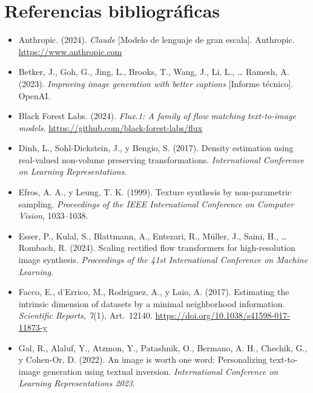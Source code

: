 \documentclass[12pt, a4paper, twoside]{book}
\begin{document}
\chapter*{Referencias bibliográficas}

\begin{itemize}[leftmargin=1.5em, itemsep=4pt]

\item Anthropic. (2024). \textit{Claude} [Modelo de lenguaje de gran escala]. Anthropic. \url{https://www.anthropic.com}

\item Betker, J., Goh, G., Jing, L., Brooks, T., Wang, J., Li, L., \ldots{} Ramesh, A. (2023). \textit{Improving image generation with better captions} [Informe técnico]. OpenAI.

\item Black Forest Labs. (2024). \textit{Flux.1: A family of flow matching text-to-image models}. \url{https://github.com/black-forest-labs/flux}

\item Dinh, L., Sohl-Dickstein, J., y Bengio, S. (2017). Density estimation using real-valued non-volume preserving transformations. \textit{International Conference on Learning Representations}.

\item Efros, A. A., y Leung, T. K. (1999). Texture synthesis by non-parametric sampling. \textit{Proceedings of the IEEE International Conference on Computer Vision}, 1033--1038.

\item Esser, P., Kulal, S., Blattmann, A., Entezari, R., M{\"u}ller, J., Saini, H., \ldots{} Rombach, R. (2024). Scaling rectified flow transformers for high-resolution image synthesis. \textit{Proceedings of the 41st International Conference on Machine Learning}.

\item Facco, E., d'Errico, M., Rodriguez, A., y Laio, A. (2017). Estimating the intrinsic dimension of datasets by a minimal neighborhood information. \textit{Scientific Reports, 7}(1), Art.~12140. \url{https://doi.org/10.1038/s41598-017-11873-y}

\item Gal, R., Alaluf, Y., Atzmon, Y., Patashnik, O., Bermano, A. H., Chechik, G., y Cohen-Or, D. (2022). An image is worth one word: Personalizing text-to-image generation using textual inversion. \textit{International Conference on Learning Representations 2023}.


\end{itemize}
\end{document}

